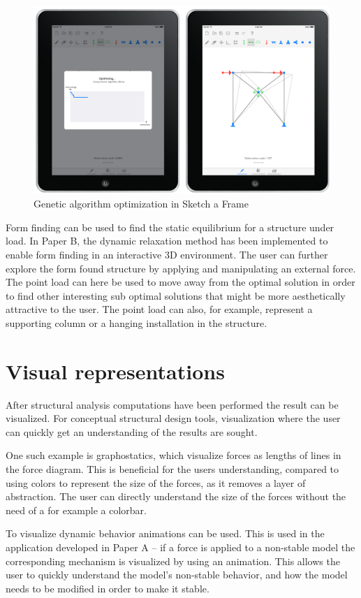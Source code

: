 \begin{figure}
  \includegraphics[width=330pt]{graphics/ipad-ga.png}
  \caption{Genetic algorithm optimization in Sketch a Frame}
  \label{fig:ipad-ga}
\end{figure}

Form finding can be used to find the static equilibrium for a structure under load. In Paper B, the dynamic relaxation method has been implemented to enable form finding in an interactive 3D environment. The user can further explore the form found structure by applying and manipulating an external force. The point load can here be used to move away from the optimal solution in order to find other interesting sub optimal solutions that might be more aesthetically attractive to the user. The point load can also, for example, represent a supporting column or a hanging installation in the structure.


\section{Visual representations}
After structural analysis computations have been performed the result can be visualized. For conceptual structural design tools, visualization where the user can quickly get an understanding of the results are sought. 

One such example is graphostatics, which visualize forces as lengths of lines in the force diagram. This is beneficial for the users understanding, compared to using colors to represent the size of the forces, as it removes a layer of abstraction. The user can directly understand the size of the forces without the need of a for example a colorbar.

To visualize dynamic behavior animations can be used. This is used in the application developed in Paper A – if a force is applied to a non-stable model the corresponding mechanism is visualized by using an animation. This allows the user to quickly understand the model’s non-stable behavior, and how the model needs to be modified in order to make it stable. 

